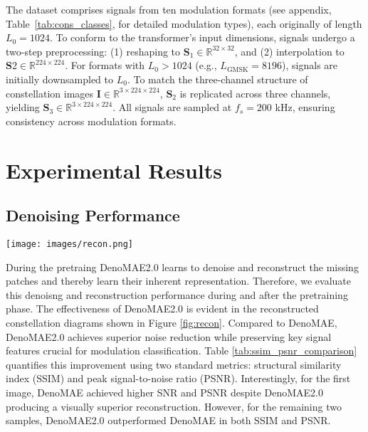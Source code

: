 The dataset comprises signals from ten modulation formats (see appendix, Table~\ref{tab:cons_classes}, for detailed modulation types), each originally of length $L_0 = 1024$. To conform to the transformer's input dimensions, signals undergo a two-step preprocessing: (1) reshaping to $\mathbf{S}_1 \in \mathbb{R}^{32 \times 32}$, and (2) interpolation to $\mathbf{S}2 \in \mathbb{R}^{224 \times 224}$. For formats with $L_0 > 1024$ (e.g., $L_\text{GMSK} = 8196$), signals are initially downsampled to $L_0$. To match the three-channel structure of constellation images $\mathbf{I} \in \mathbb{R}^{3 \times 224 \times 224}$, $\mathbf{S}_2$ is replicated across three channels, yielding $\mathbf{S}_3 \in \mathbb{R}^{3 \times 224 \times 224}$. All signals are sampled at $f_s = 200$ kHz, ensuring consistency across modulation formats. 

\section{Experimental Results}

\subsection{Denoising Performance}

\begin{figure*}[htbp]
    \centering
    \texttt{[image: images/recon.png]}
    \caption{Reconstruction performance comparison between DenoMAE and DenoMAE2.0}
    \label{fig:recon}
\end{figure*}

During the pretraing DenoMAE2.0 learns to denoise and reconstruct the missing patches and thereby learn their inherent representation. Therefore, we evaluate this denoisng and reconstruction performance during and after the pretraining phase. The effectiveness of DenoMAE2.0 is evident in the reconstructed constellation diagrams shown in Figure \ref{fig:recon}. Compared to DenoMAE, DenoMAE2.0 achieves superior noise reduction while preserving key signal features crucial for modulation classification. Table \ref{tab:ssim_psnr_comparison} quantifies this improvement using two standard metrics: structural similarity index (SSIM) and peak signal-to-noise ratio (PSNR). Interestingly, for the first image, DenoMAE achieved higher SNR and PSNR despite DenoMAE2.0 producing a visually superior reconstruction. However, for the remaining two samples, DenoMAE2.0 outperformed DenoMAE in both SSIM and PSNR.

